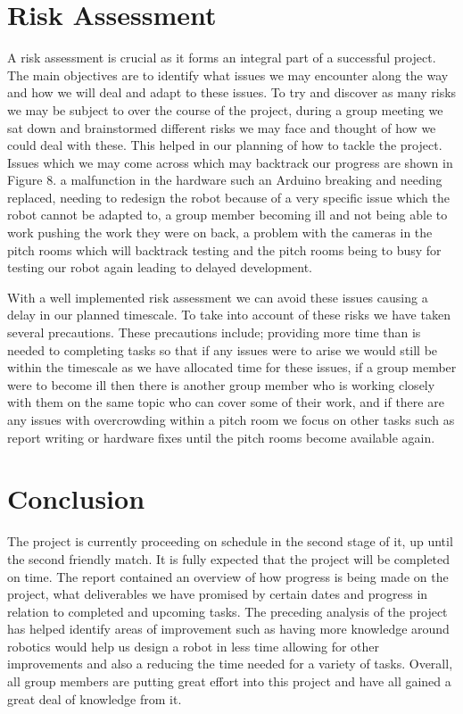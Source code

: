 \documentclass{article}
\begin{document}
\section{Risk Assessment}
A risk assessment is crucial as it forms an integral part of a successful project. The main objectives are to identify what issues we may encounter along the way and how we will deal and adapt to these issues.
To try and discover as many risks we may be subject to over the course of the project, during a group meeting we sat down and brainstormed different risks we may face and thought of how we could deal with these. This helped in our planning of how to tackle the project.
Issues which we may come across which may backtrack our progress are shown in Figure 8.
\; a malfunction in the hardware such an Arduino breaking and needing replaced, needing to redesign the robot because of a very specific issue which the robot cannot be adapted to, a group member becoming ill and not being able to work pushing the work they were on back, a problem with the cameras in the pitch rooms which will backtrack testing and the pitch rooms being to busy for testing our robot again leading to delayed development.

With a well implemented risk assessment we can avoid these issues causing a delay in our planned timescale. To take into account of these risks we have taken several precautions. These precautions include; providing more time than is needed to completing tasks so that if any issues were to arise we would still be within the timescale as we have allocated time for these issues, if a group member were to become ill then there is another group member who is working closely with them on the same topic who can cover some of their work, and if there are any issues with overcrowding within a pitch room we focus on other tasks such as report writing or hardware fixes until the pitch rooms become available again. 

\section{Conclusion}
The project is currently proceeding on schedule in the second stage of it, up until the second friendly match. It is fully expected that the project will be completed on time.
The report contained an overview of how progress is being made on the project, what deliverables we have promised by certain dates and progress in relation to completed and upcoming tasks. The preceding analysis of the project has helped identify areas of improvement such as having more knowledge around robotics would help us design a robot in less time allowing for other improvements and also a reducing the time needed for a variety of tasks. Overall, all group members are putting great effort into this project and have all gained a great deal of knowledge from it.
 
\end{document}
